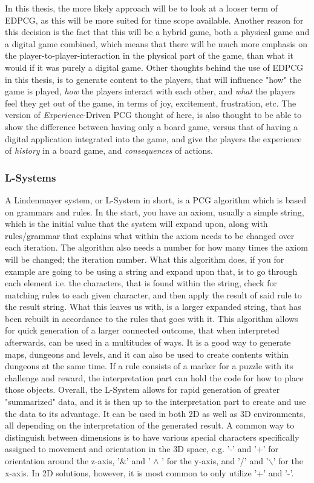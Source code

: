In this thesis, the more likely approach will be to look at a looser term of EDPCG, as this will be more suited for time scope available.
Another reason for this decision is the fact that this will be a hybrid game, both a physical game and a digital game combined, which means that there will be much more emphasis on the player-to-player-interaction in the physical part of the game, than what it would if it was purely a digital game. Other thoughts behind the use of EDPCG in this thesis, is to generate content to the players, that will influence "how" the game is played, \textit{how} the players interact with each other, and \textit{what} the players feel they get out of the game, in terms of joy, excitement, frustration, etc. 
The version of \textit{Experience}-Driven PCG thought of here, is also thought to be able to show the difference between having only a board game, versus that of having a digital application integrated into the game, and give the players the experience of \textit{history} in a board game, and \textit{consequences} of actions.

\subsubsection{L-Systems}
A Lindenmayer system, or L-System in short, is a PCG algorithm which is based on grammars and rules. In the start, you have an axiom, usually a simple string, which is the initial value that the system will expand upon, along with rules/grammar that explains what within the axiom needs to be changed over each iteration. The algorithm also needs a number for how many times the axiom will be changed; the iteration number. What this algorithm does, if you for example are going to be using a string and expand upon that, is to go through each element i.e. the characters, that is found within the string, check for matching rules to each given character, and then apply the result of said rule to the result string.
What this leaves us with, is a larger expanded string, that has been rebuilt in accordance to the rules that goes with it. This algorithm allows for quick generation of a larger connected outcome, that when interpreted afterwards, can be used in a multitudes of ways. It is a good way to generate maps, dungeons and levels, and it can also be used to create contents within dungeons at the same time. If a rule consists of a marker for a puzzle with its challenge and reward, the interpretation part can hold the code for how to place those objects. 
Overall, the L-System allows for rapid generation of greater "summarized" data, and it is then up to the interpretation part to create and use the data to its advantage.
It can be used in both 2D as well as 3D environments, all depending on the interpretation of the generated result. A common way to distinguish between dimensions is to have various special characters specifically assigned to movement and orientation in the 3D space, e.g. '-' and '+' for orientation around the z-axis, '$\&$' and ' $\wedge$ ' for the y-axis, and '/' and '$\backslash$' for the x-axis. In 2D solutions, however, it is most common to only utilize '+' and '-'. 

